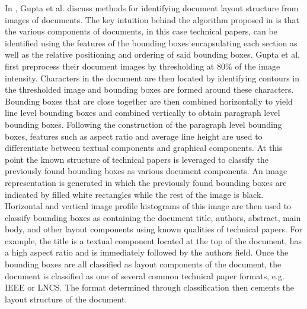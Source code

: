 \documentclass[10pt]{IEEEtran}
\begin{document}
In \cite{3}, Gupta et al. discuss methods for identifying document layout structure from images of documents. The key intuition behind the algorithm proposed in \cite{3} is that the various components of documents, in this case technical papers, can be identified using the features of the bounding boxes encapsulating each section as well as the relative positioning and ordering of said bounding boxes. Gupta et al. first preprocess their document images by thresholding at 80\% of the image intensity. 
Characters in the document are then located by identifying contours in the thresholded image and bounding boxes are formed around these characters. Bounding boxes that are close together are then combined horizontally to yield line level bounding boxes and combined vertically to obtain paragraph level bounding boxes. Following the construction of the paragraph level bounding boxes, features such as aspect ratio and average line height are used to differentiate between textual components and graphical components. 
At this point the known structure of technical papers is leveraged to classify the previously found bounding boxes as various document components. An image representation is generated in which the previously found bounding boxes are indicated by filled white rectangles while the rest of the image is black. Horizontal and vertical image profile histograms of this image are then used to classify bounding boxes as containing the document title, authors, abstract, main body, and other layout components using known qualities of technical papers. For example, the title is a textual component located at the top of the document, has a high aspect ratio and is immediately followed by the authors field. Once the bounding boxes are all classified as layout components of the document, the document is classified as one of several common technical paper formats, e.g. IEEE or LNCS. The format determined through classification then cements the layout structure of the document.
\end{document}
